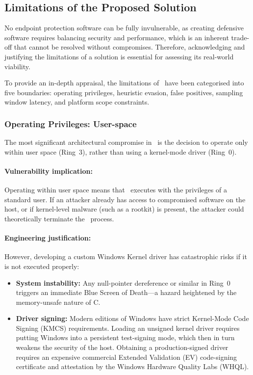 \subsection{Limitations of the Proposed Solution}

No endpoint protection software can be fully invulnerable, as creating defensive software requires balancing security and performance, which is an inherent trade-off that cannot be resolved without compromises. Therefore, acknowledging and justifying the limitations of a solution is essential for assessing its real-world viability.

To provide an in-depth appraisal, the limitations of \projectNameFormatted\ have been categorised into five boundaries: operating privileges, heuristic evasion, false positives, sampling window latency, and platform scope constraints.

\subsubsection{Operating Privileges: User-space}

The most significant architectural compromise in \projectNameFormatted\ is the decision to operate only within user space (Ring~3), rather than using a kernel-mode driver (Ring~0).

\paragraph{Vulnerability implication:}
Operating within user space means that \projectNameFormatted\ executes with the privileges of a standard user. If an attacker already has access to compromised software on the host, or if kernel-level malware (such as a rootkit) is present, the attacker could theoretically terminate the \projectNameFormatted\ process.

\paragraph{Engineering justification:}
However, developing a custom Windows Kernel driver has catastrophic risks if it is not executed properly:

\begin{itemize}
	\item \textbf{System instability:} Any null-pointer dereference or similar in Ring~0 triggers an immediate Blue Screen of Death---a hazard heightened by the memory-unsafe nature of C.
	\item \textbf{Driver signing:} Modern editions of Windows have strict Kernel-Mode Code Signing (KMCS) requirements. Loading an unsigned kernel driver requires putting Windows into a persistent test-signing mode, which then in turn weakens the security of the host. Obtaining a production-signed driver requires an expensive commercial Extended Validation (EV) code-signing certificate and attestation by the Windows Hardware Quality Labs (WHQL).
\end{itemize}

